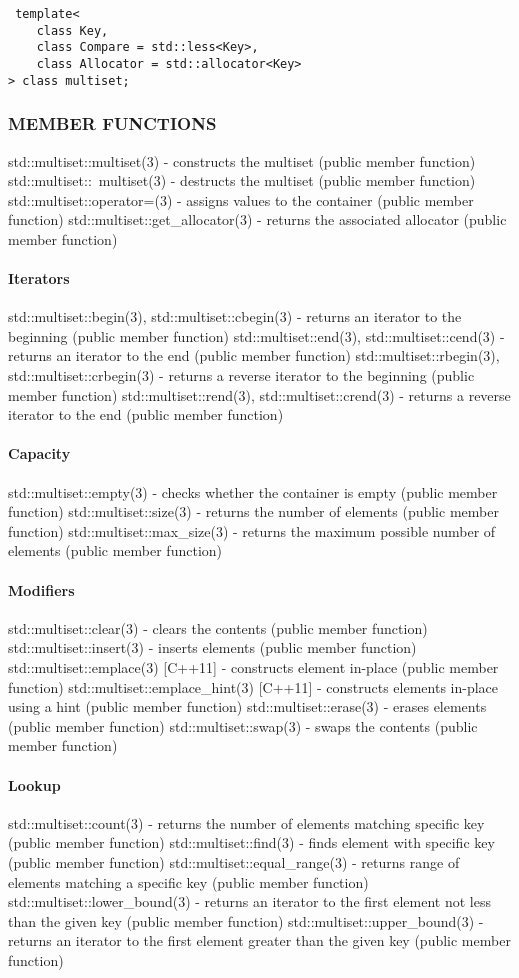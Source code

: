 \begin{lstlisting}
 template<
    class Key,
    class Compare = std::less<Key>,
    class Allocator = std::allocator<Key>
> class multiset;
\end{lstlisting}

\subsubsection{MEMBER FUNCTIONS}
std::multiset::multiset(3) - constructs the multiset  (public member function)
std::multiset::~multiset(3) - destructs the multiset  (public member function)
std::multiset::operator=(3) - assigns values to the container   (public member function)
std::multiset::get\_allocator(3) - returns the associated allocator   (public member function)
\paragraph{Iterators}
std::multiset::begin(3), std::multiset::cbegin(3) - returns an iterator to the beginning   (public member function)
std::multiset::end(3), std::multiset::cend(3) - returns an iterator to the end   (public member function)
std::multiset::rbegin(3), std::multiset::crbegin(3) - returns a reverse iterator to the beginning   (public member function)
std::multiset::rend(3), std::multiset::crend(3) - returns a reverse iterator to the end   (public member function)
\paragraph{Capacity}
std::multiset::empty(3) - checks whether the container is empty   (public member function)
std::multiset::size(3) - returns the number of elements   (public member function)
std::multiset::max\_size(3) - returns the maximum possible number of elements   (public member function)
\paragraph{Modifiers}
std::multiset::clear(3) - clears the contents   (public member function)
std::multiset::insert(3) - inserts elements   (public member function)
std::multiset::emplace(3) [C++11] - constructs element in-place   (public member function)
std::multiset::emplace\_hint(3) [C++11] - constructs elements in-place using a hint   (public member function)
std::multiset::erase(3) - erases elements   (public member function)
std::multiset::swap(3) - swaps the contents   (public member function)
\paragraph{Lookup}
std::multiset::count(3) - returns the number of elements matching specific key   (public member function)
std::multiset::find(3) - finds element with specific key  (public member function)
std::multiset::equal\_range(3) - returns range of elements matching a specific key  (public member function)
std::multiset::lower\_bound(3) - returns an iterator to the first element not less than the given key  (public member function)
std::multiset::upper\_bound(3) - returns an iterator to the first element greater than the given key  (public member function)
